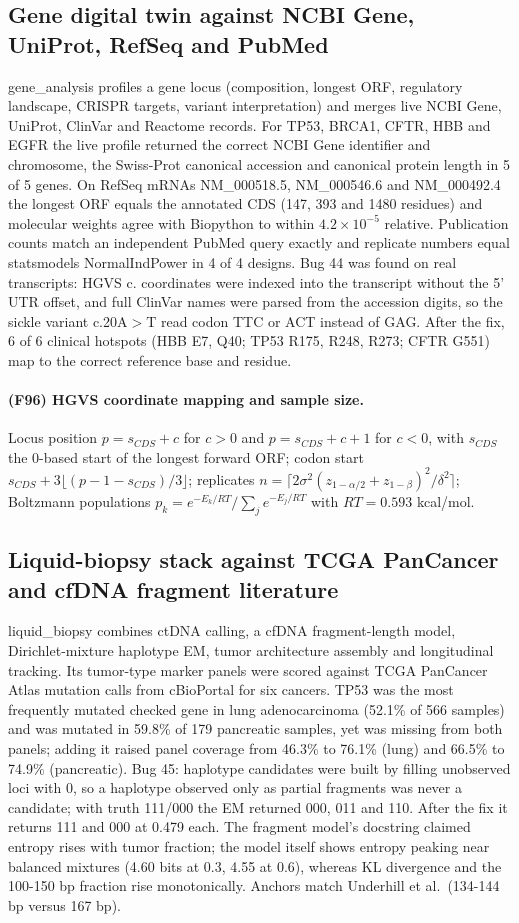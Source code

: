 \subsection{Gene digital twin against NCBI Gene, UniProt, RefSeq and PubMed}
gene\_analysis profiles a gene locus (composition, longest ORF, regulatory landscape, CRISPR targets, variant interpretation) and merges live NCBI Gene, UniProt, ClinVar and Reactome records. For TP53, BRCA1, CFTR, HBB and EGFR the live profile returned the correct NCBI Gene identifier and chromosome, the Swiss-Prot canonical accession and canonical protein length in 5 of 5 genes. On RefSeq mRNAs NM\_000518.5, NM\_000546.6 and NM\_000492.4 the longest ORF equals the annotated CDS (147, 393 and 1480 residues) and molecular weights agree with Biopython to within $4.2\times10^{-5}$ relative. Publication counts match an independent PubMed query exactly and replicate numbers equal statsmodels NormalIndPower in 4 of 4 designs. Bug 44 was found on real transcripts: HGVS c. coordinates were indexed into the transcript without the 5' UTR offset, and full ClinVar names were parsed from the accession digits, so the sickle variant c.20A$>$T read codon TTC or ACT instead of GAG. After the fix, 6 of 6 clinical hotspots (HBB E7, Q40; TP53 R175, R248, R273; CFTR G551) map to the correct reference base and residue.
\paragraph{(F96) HGVS coordinate mapping and sample size.} Locus position $p=s_{CDS}+c$ for $c>0$ and $p=s_{CDS}+c+1$ for $c<0$, with $s_{CDS}$ the 0-based start of the longest forward ORF; codon start $s_{CDS}+3\lfloor(p-1-s_{CDS})/3\rfloor$; replicates $n=\lceil 2\sigma^2(z_{1-\alpha/2}+z_{1-\beta})^2/\delta^2\rceil$; Boltzmann populations $p_k=e^{-E_k/RT}/\sum_j e^{-E_j/RT}$ with $RT=0.593$ kcal/mol.
\subsection{Liquid-biopsy stack against TCGA PanCancer and cfDNA fragment literature}
liquid\_biopsy combines ctDNA calling, a cfDNA fragment-length model, Dirichlet-mixture haplotype EM, tumor architecture assembly and longitudinal tracking. Its tumor-type marker panels were scored against TCGA PanCancer Atlas mutation calls from cBioPortal for six cancers. TP53 was the most frequently mutated checked gene in lung adenocarcinoma (52.1\% of 566 samples) and was mutated in 59.8\% of 179 pancreatic samples, yet was missing from both panels; adding it raised panel coverage from 46.3\% to 76.1\% (lung) and 66.5\% to 74.9\% (pancreatic). Bug 45: haplotype candidates were built by filling unobserved loci with 0, so a haplotype observed only as partial fragments was never a candidate; with truth 111/000 the EM returned 000, 011 and 110. After the fix it returns 111 and 000 at 0.479 each. The fragment model's docstring claimed entropy rises with tumor fraction; the model itself shows entropy peaking near balanced mixtures (4.60 bits at 0.3, 4.55 at 0.6), whereas KL divergence and the 100-150 bp fraction rise monotonically. Anchors match Underhill et al.\ (134-144 bp versus 167 bp).
